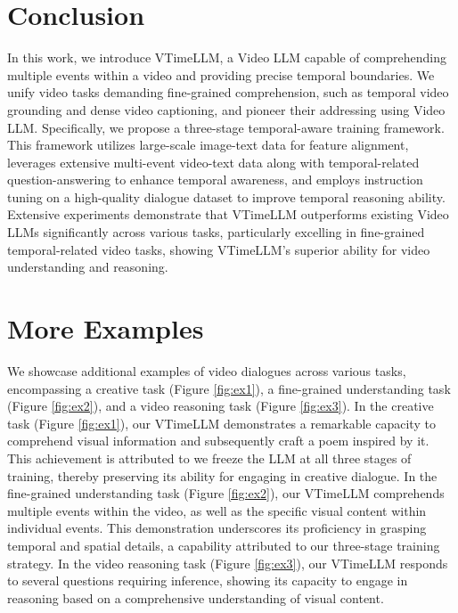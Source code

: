 \documentclass[10pt,twocolumn,letterpaper]{article}
\begin{document}
 \section{Conclusion}

In this work, we introduce VTimeLLM, a Video LLM capable of comprehending multiple events within a video and providing precise temporal boundaries. We unify video tasks demanding fine-grained comprehension, such as temporal video grounding and dense video captioning, and pioneer their addressing using Video LLM. Specifically, we propose a three-stage temporal-aware training framework. This framework utilizes large-scale image-text data for feature alignment, leverages extensive multi-event video-text data along with temporal-related question-answering to enhance temporal awareness, and employs instruction tuning on a high-quality dialogue dataset to improve temporal reasoning ability. Extensive experiments demonstrate that VTimeLLM outperforms existing Video LLMs significantly across various tasks, particularly excelling in fine-grained temporal-related video tasks, showing VTimeLLM's superior ability for video understanding and reasoning. 
{
    \small
    
    
}


\clearpage
\setcounter{page}{1}
\appendix
\section{More Examples}

We showcase additional examples of video dialogues across various tasks, encompassing a creative task (Figure \ref{fig:ex1}), a fine-grained understanding task (Figure \ref{fig:ex2}), and a video reasoning task (Figure \ref{fig:ex3}). In the creative task (Figure \ref{fig:ex1}), our VTimeLLM demonstrates a remarkable capacity to comprehend visual information and subsequently craft a poem inspired by it. This achievement is attributed to we freeze the LLM at all three stages of training, thereby preserving its ability for engaging in creative dialogue. In the fine-grained understanding task (Figure \ref{fig:ex2}), our VTimeLLM comprehends multiple events within the video, as well as the specific visual content within individual events. This demonstration underscores its proficiency in grasping temporal and spatial details, a capability attributed to our three-stage training strategy. In the video reasoning task (Figure \ref{fig:ex3}), our VTimeLLM responds to several questions requiring inference, showing its capacity to engage in reasoning based on a comprehensive understanding of visual content.
\end{document}
